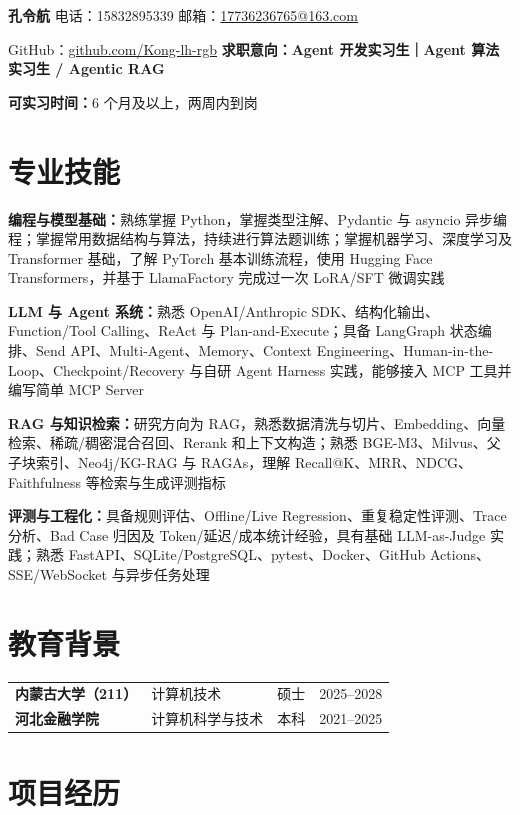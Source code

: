 \documentclass[a4paper,10pt]{article}
\newcommand{\skill}[2]{\textbf{#1：}#2\par\vspace{2.5pt}}
\begin{document}
{\LARGE\textbf{孔令航}}\hfill
电话：15832895339\quad
邮箱：\href{mailto:17736236765@163.com}{17736236765@163.com}

\vspace{3pt}
GitHub：\href{https://github.com/Kong-lh-rgb}{github.com/Kong-lh-rgb}
\hfill
\textbf{求职意向：Agent 开发实习生｜Agent 算法实习生 / Agentic RAG}

\vspace{2pt}
\textbf{可实习时间：}6 个月及以上，两周内到岗

\section{专业技能}

\skill{编程与模型基础}{熟练掌握 Python，掌握类型注解、Pydantic 与 asyncio 异步编程；掌握常用数据结构与算法，持续进行算法题训练；掌握机器学习、深度学习及 Transformer 基础，了解 PyTorch 基本训练流程，使用 Hugging Face Transformers，并基于 LlamaFactory 完成过一次 LoRA/SFT 微调实践}
\skill{LLM 与 Agent 系统}{熟悉 OpenAI/Anthropic SDK、结构化输出、Function/Tool Calling、ReAct 与 Plan-and-Execute；具备 LangGraph 状态编排、Send API、Multi-Agent、Memory、Context Engineering、Human-in-the-Loop、Checkpoint/Recovery 与自研 Agent Harness 实践，能够接入 MCP 工具并编写简单 MCP Server}
\skill{RAG 与知识检索}{研究方向为 RAG，熟悉数据清洗与切片、Embedding、向量检索、稀疏/稠密混合召回、Rerank 和上下文构造；熟悉 BGE-M3、Milvus、父子块索引、Neo4j/KG-RAG 与 RAGAs，理解 Recall@K、MRR、NDCG、Faithfulness 等检索与生成评测指标}
\skill{评测与工程化}{具备规则评估、Offline/Live Regression、重复稳定性评测、Trace 分析、Bad Case 归因及 Token/延迟/成本统计经验，具有基础 LLM-as-Judge 实践；熟悉 FastAPI、SQLite/PostgreSQL、pytest、Docker、GitHub Actions、SSE/WebSocket 与异步任务处理}

\section{教育背景}

\begin{tabularx}{\textwidth}{@{}X X c r@{}}
\textbf{内蒙古大学（211）} & 计算机技术 & 硕士 & 2025--2028\\
\textbf{河北金融学院} & 计算机科学与技术 & 本科 & 2021--2025\\
\end{tabularx}

\section{项目经历}
\end{document}
